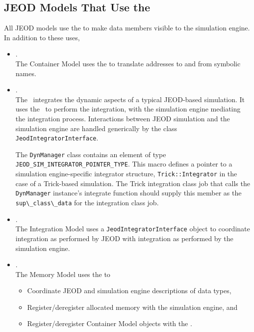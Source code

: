 \subsection{JEOD Models That Use the \ModelDesc}
All JEOD models use the \ModelDesc to make data members visible to the
simulation engine. In addition to these uses,
\begin{itemize}
\item{}.\\
The Container Model uses the \ModelDesc to translate addresses to
and from symbolic names.

\item{}.\\
The \DYNMANAGER\ integrates the dynamic aspects of a typical JEOD-based
simulation.
It uses the \INTEGRATION\ to perform the integration, with the simulation engine
mediating the integration process.
Interactions between JEOD simulation and the simulation engine are handled
generically by the \ModelDesc class \verb|JeodIntegratorInterface|.

The \verb|DynManager| class contains an element of type
\verb|JEOD_SIM_INTEGRATOR_POINTER_TYPE|.
This macro defines a pointer to a simulation engine-specific integrator
structure, \verb|Trick::Integrator| in the case of a Trick-based simulation.
The Trick integration class job that calls the \verb|DynManager| instance's
integrate function should supply this member as the \verb|sup\_class\_data|
for the integration class job.

\item{}.\\
The Integration Model uses a \ModelDesc \verb|JeodIntegratorInterface| object to
coordinate integration as performed by JEOD with integration as
performed by the simulation engine.

\item{}.\\
The Memory Model uses the \ModelDesc to
\begin{itemize}
\item Coordinate JEOD and simulation engine descriptions of data types,
\item Register/deregister allocated memory with the simulation engine, and
\item Register/deregister Container Model objects with the \ModelDesc.
\end{itemize}
\end{itemize}


